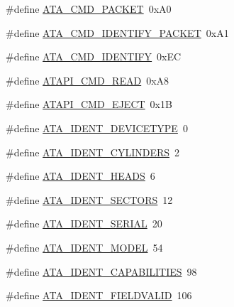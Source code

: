 \begin{DoxyCompactItemize}
\item 
\#define \hyperlink{a00005_afaaead63f9b69425b9f6514b03f0bbb2_afaaead63f9b69425b9f6514b03f0bbb2}{A\+T\+A\+\_\+\+C\+M\+D\+\_\+\+P\+A\+C\+K\+ET}~0x\+A0
\item 
\#define \hyperlink{a00005_acba68da9027d95b9bae53901a8ea009b_acba68da9027d95b9bae53901a8ea009b}{A\+T\+A\+\_\+\+C\+M\+D\+\_\+\+I\+D\+E\+N\+T\+I\+F\+Y\+\_\+\+P\+A\+C\+K\+ET}~0x\+A1
\item 
\#define \hyperlink{a00005_a572958103bba5d355c7fe135ae7526bd_a572958103bba5d355c7fe135ae7526bd}{A\+T\+A\+\_\+\+C\+M\+D\+\_\+\+I\+D\+E\+N\+T\+I\+FY}~0x\+EC
\item 
\#define \hyperlink{a00005_a46c7100054351e7afa8762a5dd165ff5_a46c7100054351e7afa8762a5dd165ff5}{A\+T\+A\+P\+I\+\_\+\+C\+M\+D\+\_\+\+R\+E\+AD}~0x\+A8
\item 
\#define \hyperlink{a00005_a94bf36a7e0a52f4dd421eca62e80631e_a94bf36a7e0a52f4dd421eca62e80631e}{A\+T\+A\+P\+I\+\_\+\+C\+M\+D\+\_\+\+E\+J\+E\+CT}~0x1B
\item 
\#define \hyperlink{a00005_a4224d2160f2f2718d8a67a09bfb8f4a5_a4224d2160f2f2718d8a67a09bfb8f4a5}{A\+T\+A\+\_\+\+I\+D\+E\+N\+T\+\_\+\+D\+E\+V\+I\+C\+E\+T\+Y\+PE}~0
\item 
\#define \hyperlink{a00005_a692fbddd7825db7edba694d647a69aa7_a692fbddd7825db7edba694d647a69aa7}{A\+T\+A\+\_\+\+I\+D\+E\+N\+T\+\_\+\+C\+Y\+L\+I\+N\+D\+E\+RS}~2
\item 
\#define \hyperlink{a00005_a1dcc2ec4b54df2f3cb011bbf6dc3795c_a1dcc2ec4b54df2f3cb011bbf6dc3795c}{A\+T\+A\+\_\+\+I\+D\+E\+N\+T\+\_\+\+H\+E\+A\+DS}~6
\item 
\#define \hyperlink{a00005_ae9be2cb739432bf835c6e5492cf92ba7_ae9be2cb739432bf835c6e5492cf92ba7}{A\+T\+A\+\_\+\+I\+D\+E\+N\+T\+\_\+\+S\+E\+C\+T\+O\+RS}~12
\item 
\#define \hyperlink{a00005_a60e929ababaf71de94d96c079f9028d0_a60e929ababaf71de94d96c079f9028d0}{A\+T\+A\+\_\+\+I\+D\+E\+N\+T\+\_\+\+S\+E\+R\+I\+AL}~20
\item 
\#define \hyperlink{a00005_a9fd52e892928c016a4a66f59a46241e4_a9fd52e892928c016a4a66f59a46241e4}{A\+T\+A\+\_\+\+I\+D\+E\+N\+T\+\_\+\+M\+O\+D\+EL}~54
\item 
\#define \hyperlink{a00005_a4efaa1ae14eb268a085d1824eb2a1f08_a4efaa1ae14eb268a085d1824eb2a1f08}{A\+T\+A\+\_\+\+I\+D\+E\+N\+T\+\_\+\+C\+A\+P\+A\+B\+I\+L\+I\+T\+I\+ES}~98
\item 
\#define \hyperlink{a00005_a4515f6ed07cf67add34766e02bd8d133_a4515f6ed07cf67add34766e02bd8d133}{A\+T\+A\+\_\+\+I\+D\+E\+N\+T\+\_\+\+F\+I\+E\+L\+D\+V\+A\+L\+ID}~106

\end{DoxyCompactItemize}
